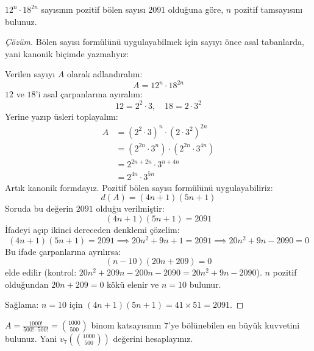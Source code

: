\begin{example}
$12^n \cdot 18^{2n}$ sayısının pozitif bölen sayısı $2091$ olduğuna göre, $n$ pozitif tamsayısını bulunuz.
\end{example}

\begin{proof}[Çözüm]
Bölen sayısı formülünü uygulayabilmek için sayıyı önce asal tabanlarda, yani kanonik biçimde yazmalıyız:

Verilen sayıyı $A$ olarak adlandıralım:
\[ A = 12^n \cdot 18^{2n} \]
$12$ ve $18$'i asal çarpanlarına ayıralım:
\[ 12 = 2^2 \cdot 3, \quad 18 = 2 \cdot 3^2 \]
Yerine yazıp üsleri toplayalım:
\begin{align*}
A &= (2^2 \cdot 3)^n \cdot (2 \cdot 3^2)^{2n} \\
  &= (2^{2n} \cdot 3^n) \cdot (2^{2n} \cdot 3^{4n}) \\
  &= 2^{2n + 2n} \cdot 3^{n + 4n} \\
  &= 2^{4n} \cdot 3^{5n}
\end{align*}
Artık kanonik formdayız. Pozitif bölen sayısı formülünü uygulayabiliriz:
\[ d(A) = (4n + 1)(5n + 1) \]
Soruda bu değerin $2091$ olduğu verilmiştir:
\[ (4n + 1)(5n + 1) = 2091 \]
İfadeyi açıp ikinci dereceden denklemi çözelim:
\[ (4n+1)(5n+1) = 2091 \implies 20n^2 + 9n + 1 = 2091 \implies 20n^2 + 9n - 2090 = 0 \]
Bu ifade çarpanlarına ayrılırsa:
\[ (n - 10)(20n + 209) = 0 \]
elde edilir (kontrol: $20n^2 + 209n - 200n - 2090 = 20n^2 + 9n - 2090$). $n$ pozitif olduğundan $20n + 209 = 0$ kökü elenir ve $n = 10$ bulunur.

Sağlama: $n = 10$ için $(4n+1)(5n+1) = 41 \times 51 = 2091$.
\end{proof}

\begin{example}
$A = \frac{1000!}{500! \cdot 500!} = \binom{1000}{500}$ binom katsayısının $7$'ye bölünebilen en büyük kuvvetini bulunuz. Yani $v_7\left(\binom{1000}{500}\right)$ değerini hesaplayınız.
\end{example}

